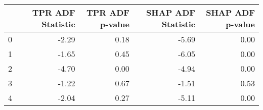 \begin{tabular}{lrrrr}
\toprule
 & TPR ADF Statistic & TPR ADF p-value & SHAP ADF Statistic & SHAP ADF p-value \\
\midrule
0 & -2.29 & 0.18 & -5.69 & 0.00 \\
1 & -1.65 & 0.45 & -6.05 & 0.00 \\
2 & -4.70 & 0.00 & -4.94 & 0.00 \\
3 & -1.22 & 0.67 & -1.51 & 0.53 \\
4 & -2.04 & 0.27 & -5.11 & 0.00 \\
\bottomrule
\end{tabular}

